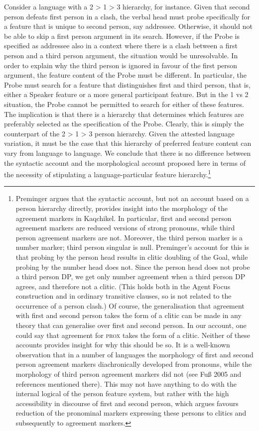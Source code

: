 \documentclass[output=paper]{langsci/langscibook}
\begin{document}
  Consider a language with a 2 > 1 > 3 hierarchy, for instance. Given that second person defeats first person in a clash, the verbal head must probe specifically for a feature that is unique to second person, say addressee. Otherwise, it should not be able to skip a first person argument in its search. However, if the Probe is specified as addressee also in a context where there is a clash between a first person and a third person argument, the situation would be unresolvable. In order to explain why the third person is ignored in favour of the first person argument, the feature content of the Probe must be different. In particular, the Probe must search for a feature that distinguishes first and third person, that is, either a Speaker feature or a more general participant feature. But in the 1 vs 2 situation, the Probe cannot be permitted to search for either of these features. The implication is that there is a hierarchy that determines which features are preferably selected as the specification of the Probe. Clearly, this is simply the counterpart of the 2 > 1 > 3 person hierarchy. Given the attested language variation, it must be the case that this hierarchy of preferred feature content can vary from language to language. We conclude that there is no difference between the syntactic account and the morphological account proposed here in terms of the necessity of stipulating a language-particular feature hierarchy.\footnote{Preminger argues that the syntactic account, but not an account based on a person hierarchy directly, provides insight into the morphology of the agreement markers in Kaqchikel. In particular, first and second person agreement markers are reduced versions of strong pronouns, while third person agreement markers are not. Moreover, the third person marker is a number marker; third person singular is null. Preminger’s account for this is that probing by the person head results in clitic doubling of the Goal, while probing by the number head does not. Since the person head does not probe a third person DP, we get only number agreement when a third person DP agrees, and therefore not a clitic. (This holds both in the Agent Focus construction and in ordinary transitive clauses, so is not related to the occurrence of a person clash.) Of course, the generalisation that agreement with first and second person takes the form of a clitic can be made in any theory that can generalise over first and second person. In our account, one could say that agreement for \textsc{prox} takes the form of a clitic. Neither of these accounts provides insight for why this should be so. It is a well-known observation that in a number of languages the morphology of first and second person agreement markers diachronically developed from pronouns, while the morphology of third person agreement markers did not (see Fuß 2005 and references mentioned there). This may not have anything to do with the internal logical of the person feature system, but rather with the high accessibility in discourse of first and second person, which \citet{Ariel2000} argues favours reduction of the pronominal markers expressing these persons to clitics and subsequently to agreement markers.}
\end{document}

